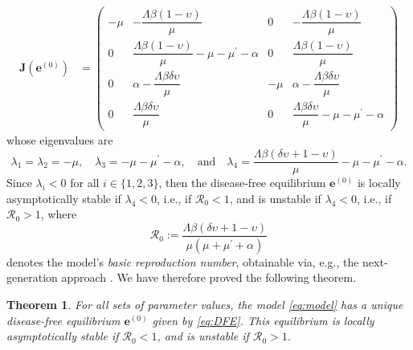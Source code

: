 \documentclass[11pt,reqno]{amsart}
\newtheorem{theorem}{Theorem}
\newcommand{\corr}[1]{\textcolor{blue}{#1}}
\newcommand{\cR}{\mathcal{R}}
\begin{document}
\begin{align*}
\mathbf{J}\left(\mathbf{e}^{\left(0\right)}\right) &=\left( 
\begin{array}{cccc}
-\mu & - \dfrac{\Lambda\beta\left( 1-\upsilon \right) }{\mu } & 0 & -\dfrac{\Lambda\beta\left( 1-\upsilon \right) }{\mu } \\[0.3cm]
0 & \dfrac{\Lambda\beta\left( 1-\upsilon \right) }{\mu }-\mu -\mu ^{\prime
}-\alpha & 0 & \dfrac{\Lambda\beta\left( 1-\upsilon \right) }{\mu } \\[0.3cm]
0 & \alpha -\dfrac{\Lambda \beta\delta \upsilon  }{\mu } & -\mu & \alpha-\dfrac{\Lambda \beta\delta \upsilon  }{\mu } \\[0.3cm]
0 & \dfrac{\Lambda \beta\delta \upsilon  }{\mu } & 0 & \dfrac{\Lambda \beta\delta \upsilon  }{\mu } -\mu -\mu ^{\prime }-\alpha
\end{array}
\right)
\end{align*}
whose eigenvalues are
$$\lambda _{1}=\lambda_2=-\mu,\quad\lambda _{3}= -\mu -\mu ^{\prime }-\alpha,\quad \text{and}\quad \lambda _{4}=\frac{\Lambda\beta \left(\delta \upsilon+1-\upsilon\right)}{\mu }-\mu-\mu^{\prime}-\alpha.$$
Since $\lambda _i<0$ for all $i\in\{1,2,3\}$, then the disease-free equilibrium $\mathbf{e}^{\left(0\right)}$ is locally asymptotically stable if $\lambda_4<0$, i.e., if $\cR_0<1$, and is unstable if $\lambda_4<0$, i.e., if $\cR_{0}>1$, where
\begin{equation}\label{eq:R0}
\cR_0:=\frac{\Lambda \beta \left( \delta
\upsilon +1-\upsilon \right) }{\mu \left( \mu +\mu ^{\prime }+\alpha\right) 
}
\end{equation}
denotes the model's \textit{basic reproduction number}, obtainable via, e.g., the next-generation approach \cite{DiekmannHeesterbeekMetz,DriesscheWatmough}. We have therefore proved the following theorem.\smallskip

\begin{theorem}\label{thm:DFE}
For all sets of parameter values, the model \eqref{eq:model} has a unique disease-free equilibrium $\mathbf{e}^{\left(0\right)}$ given by \eqref{eq:DFE}. This equilibrium is locally asymptotically stable if $\cR_0<1$, and is unstable if $\cR_{0}>1$.
\end{theorem}\smallskip



\end{document}

